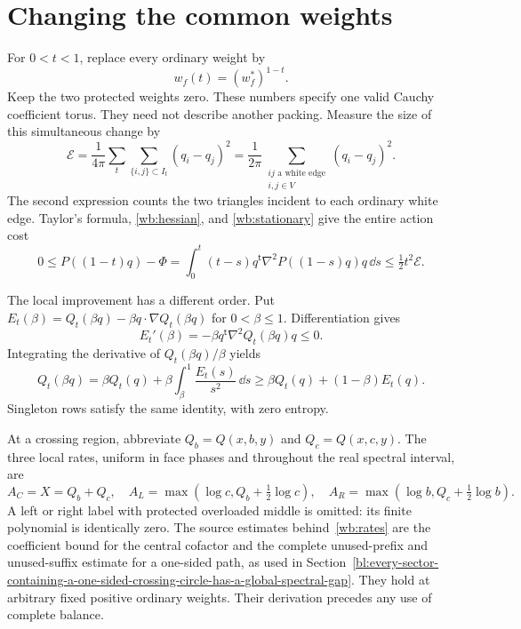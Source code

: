 \section{Changing the common weights}

For $0<t<1$, replace every ordinary weight by
\[
             w_f(t)=(w_f^*)^{1-t}.
\]
Keep the two protected weights zero. These numbers specify one valid
Cauchy coefficient torus. They need not describe another packing.
Measure the size of this simultaneous change by
\begin{equation}\label{wb:energy}
 \mathcal E=\frac1{4\pi}
       \sum_t\sum_{\{i,j\}\subset I_t}(q_i-q_j)^2
   =\frac1{2\pi}\sum_{\substack{ij\text{ a white edge}\\i,j\in V}}
                         (q_i-q_j)^2.
\end{equation}
The second expression counts the two triangles incident to each
ordinary white edge. Taylor's formula, \eqref{wb:hessian}, and
\eqref{wb:stationary} give the entire action cost
\begin{equation}\label{wb:cost}
 0\le P((1-t)q)-\Phi
   =\int_0^t(t-s)q^{\mathsf t}\nabla^2P((1-s)q)q\,\dd s
   \le\tfrac12t^2\mathcal E.
\end{equation}

The local improvement has a different order. Put
$E_t(\beta)=Q_t(\beta q)-\beta q\cdot\nabla Q_t(\beta q)$ for
$0<\beta\le1$. Differentiation gives
\[
 E_t'(\beta)=-\beta q^{\mathsf t}\nabla^2Q_t(\beta q)q\le0.
\]
Integrating the derivative of $Q_t(\beta q)/\beta$ yields
\begin{equation}\label{wb:entropy-gain}
 Q_t(\beta q)=\beta Q_t(q)+
     \beta\int_\beta^1\frac{E_t(s)}{s^2}\,\dd s
 \ge\beta Q_t(q)+(1-\beta)E_t(q).
\end{equation}
Singleton rows satisfy the same identity, with zero entropy.

At a crossing region, abbreviate $Q_b=Q(x,b,y)$ and $Q_c=Q(x,c,y)$.
The three local rates, uniform in face phases and throughout the
real spectral interval, are
\begin{equation}\label{wb:rates}
 A_C=X=Q_b+Q_c,\quad
 A_L=\max(\log c,Q_b+\tfrac12\log c),\quad
 A_R=\max(\log b,Q_c+\tfrac12\log b).
\end{equation}
A left or right label with protected overloaded middle is omitted:
its finite polynomial is identically zero. The source estimates
behind~\eqref{wb:rates} are the coefficient bound for the central
cofactor and the complete unused-prefix and unused-suffix estimate
for a one-sided path, as used in
Section~\ref{bl:every-sector-containing-a-one-sided-crossing-circle-has-a-global-spectral-gap}.
They hold at arbitrary fixed positive ordinary weights. Their derivation
precedes any use of complete balance.


